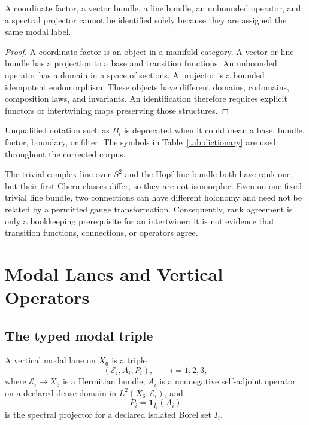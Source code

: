 \documentclass[11pt]{article}
\newcommand{\Ebundle}{\mathcal E}
\begin{document}
\begin{proposition}\label{prop:types}
A coordinate factor, a vector bundle, a line bundle, an unbounded operator,
and a spectral projector cannot be identified solely because they are
assigned the same modal label.
\end{proposition}

\begin{proof}
A coordinate factor is an object in a manifold category.  A vector or line
bundle has a projection to a base and transition functions.  An unbounded
operator has a domain in a space of sections.  A projector is a bounded
idempotent endomorphism.  These objects have different domains, codomains,
composition laws, and invariants.  An identification therefore requires
explicit functors or intertwining maps preserving those structures.
\end{proof}

Unqualified notation such as $B_i$ is deprecated when it could mean a base,
bundle, factor, boundary, or filter.  The symbols in
Table~\ref{tab:dictionary} are used throughout the corrected corpus.

\begin{example}
The trivial complex line over $S^2$ and the Hopf line bundle both have
rank one, but their first Chern classes differ, so they are not isomorphic.
Even on one fixed trivial line bundle, two connections can have different
holonomy and need not be related by a permitted gauge transformation.
Consequently, rank agreement is only a bookkeeping prerequisite for an
intertwiner; it is not evidence that transition functions, connections, or
operators agree.
\end{example}

\section{Modal Lanes and Vertical Operators}

\subsection{The typed modal triple}

\begin{definition}
A vertical modal lane on $X_6$ is a triple
\[
 (\Ebundle_i,A_i,P_i),\qquad i=1,2,3,
\]
where $\Ebundle_i\to X_6$ is a Hermitian bundle, $A_i$ is a nonnegative
self-adjoint operator on a declared dense domain in
$L^2(X_6;\Ebundle_i)$, and
\[
 P_i=\mathbf 1_{I_i}(A_i)
\]
is the spectral projector for a declared isolated Borel set $I_i$.
\end{definition}
\end{document}
